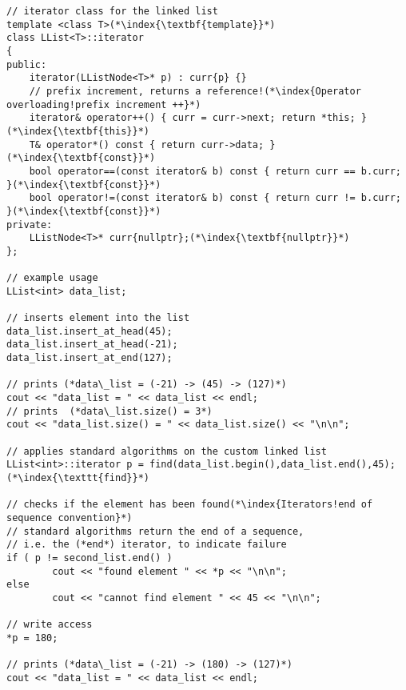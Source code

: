 \documentclass[10pt]{article}
\begin{document}
\begin{lstlisting}
// iterator class for the linked list
template <class T>(*\index{\textbf{template}}*)
class LList<T>::iterator
{
public:
    iterator(LListNode<T>* p) : curr{p} {}
    // prefix increment, returns a reference!(*\index{Operator overloading!prefix increment ++}*)
    iterator& operator++() { curr = curr->next; return *this; }(*\index{\textbf{this}}*)
    T& operator*() const { return curr->data; }(*\index{\textbf{const}}*)
    bool operator==(const iterator& b) const { return curr == b.curr; }(*\index{\textbf{const}}*)
    bool operator!=(const iterator& b) const { return curr != b.curr; }(*\index{\textbf{const}}*)
private:
    LListNode<T>* curr{nullptr};(*\index{\textbf{nullptr}}*)
};

// example usage
LList<int> data_list;

// inserts element into the list
data_list.insert_at_head(45);
data_list.insert_at_head(-21);
data_list.insert_at_end(127);

// prints (*data\_list = (-21) -> (45) -> (127)*)
cout << "data_list = " << data_list << endl;
// prints  (*data\_list.size() = 3*)
cout << "data_list.size() = " << data_list.size() << "\n\n";

// applies standard algorithms on the custom linked list
LList<int>::iterator p = find(data_list.begin(),data_list.end(),45);(*\index{\texttt{find}}*)

// checks if the element has been found(*\index{Iterators!end of sequence convention}*)
// standard algorithms return the end of a sequence, 
// i.e. the (*end*) iterator, to indicate failure
if ( p != second_list.end() )
        cout << "found element " << *p << "\n\n";
else
        cout << "cannot find element " << 45 << "\n\n";

// write access
*p = 180;

// prints (*data\_list = (-21) -> (180) -> (127)*)
cout << "data_list = " << data_list << endl;
\end{lstlisting}
%
%
\end{document}
